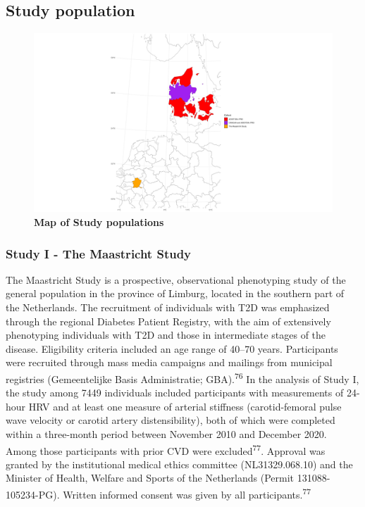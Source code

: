 \documentclass[
  a4paper,
  headsepline=true,
  open=any]{scrbook}
\begin{document}
\hypertarget{study-population}{%
\subsection{Study population}\label{study-population}}

\begin{figure}

{\centering \includegraphics[width=8in,height=\textheight]{images/cohort_map.pdf}

}

\caption{\textbf{Map of Study populations}}

\end{figure}

\hypertarget{study-i---the-maastricht-study}{%
\subsubsection{Study I - The Maastricht
Study}\label{study-i---the-maastricht-study}}

The Maastricht Study is a prospective, observational phenotyping study
of the general population in the province of Limburg, located in the
southern part of the Netherlands. The recruitment of individuals with
T2D was emphasized through the regional Diabetes Patient Registry, with
the aim of extensively phenotyping individuals with T2D and those in
intermediate stages of the disease. Eligibility criteria included an age
range of 40--70 years. Participants were recruited through mass media
campaigns and mailings from municipal registries (Gemeentelijke Basis
Administratie; GBA).\textsuperscript{76} In the analysis of Study I, the
study among 7449 individuals included participants with measurements of
24-hour HRV and at least one measure of arterial stiffness
(carotid-femoral pulse wave velocity or carotid artery distensibility),
both of which were completed within a three-month period between
November 2010 and December 2020. Among those participants with prior CVD
were excluded\textsuperscript{77}. Approval was granted by the
institutional medical ethics committee (NL31329.068.10) and the Minister
of Health, Welfare and Sports of the Netherlands (Permit
131088-105234-PG). Written informed consent was given by all
participants.\textsuperscript{77}
\end{document}
